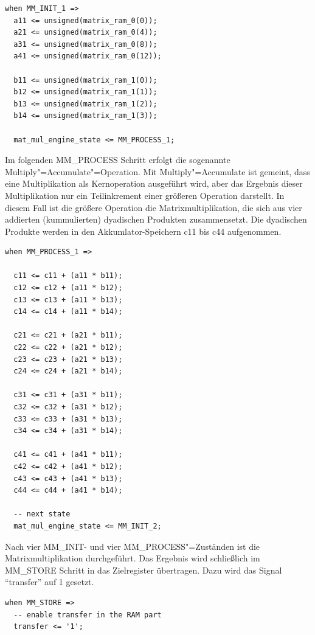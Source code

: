 \begin{lstlisting}[style=VHDLStyle,caption={Befüllen der Arbeitsregister},captionpos=b]
when MM_INIT_1 =>
  a11 <= unsigned(matrix_ram_0(0));
  a21 <= unsigned(matrix_ram_0(4));
  a31 <= unsigned(matrix_ram_0(8));
  a41 <= unsigned(matrix_ram_0(12));

  b11 <= unsigned(matrix_ram_1(0));
  b12 <= unsigned(matrix_ram_1(1));
  b13 <= unsigned(matrix_ram_1(2));
  b14 <= unsigned(matrix_ram_1(3));

  mat_mul_engine_state <= MM_PROCESS_1;
\end{lstlisting}

Im folgenden MM\_PROCESS Schritt erfolgt die sogenannte Multiply"=Accumulate"=Operation. Mit Multiply"=Accumulate ist gemeint, dass eine Multiplikation als Kernoperation ausgeführt wird, aber das Ergebnis dieser Multiplikation nur ein Teilinkrement einer größeren Operation darstellt. In diesem Fall ist die größere Operation die Matrixmultiplikation, die sich aus vier addierten (kummulierten) dyadischen Produkten zusammensetzt. Die dyadischen Produkte werden in den Akkumlator-Speichern c11 bis c44 aufgenommen.

\begin{lstlisting}[style=VHDLStyle,caption={Multiply Accumulate Schritt},captionpos=b]
when MM_PROCESS_1 =>

  c11 <= c11 + (a11 * b11);
  c12 <= c12 + (a11 * b12);
  c13 <= c13 + (a11 * b13);
  c14 <= c14 + (a11 * b14);

  c21 <= c21 + (a21 * b11);
  c22 <= c22 + (a21 * b12);
  c23 <= c23 + (a21 * b13);
  c24 <= c24 + (a21 * b14);

  c31 <= c31 + (a31 * b11);
  c32 <= c32 + (a31 * b12);
  c33 <= c33 + (a31 * b13);
  c34 <= c34 + (a31 * b14);

  c41 <= c41 + (a41 * b11);
  c42 <= c42 + (a41 * b12);
  c43 <= c43 + (a41 * b13);
  c44 <= c44 + (a41 * b14);

  -- next state
  mat_mul_engine_state <= MM_INIT_2;
\end{lstlisting}

Nach vier MM\_INIT- und vier MM\_PROCESS"=Zuständen ist die Matrixmultiplikation durchgeführt. Das Ergebnis wird schließlich im MM\_STORE Schritt in das Zielregister übertragen. Dazu wird das Signal ``transfer'' auf 1 gesetzt.

\begin{lstlisting}[style=VHDLStyle,caption={Matrixengine Transfer Flag},captionpos=b]
when MM_STORE =>
  -- enable transfer in the RAM part
  transfer <= '1';
\end{lstlisting}

